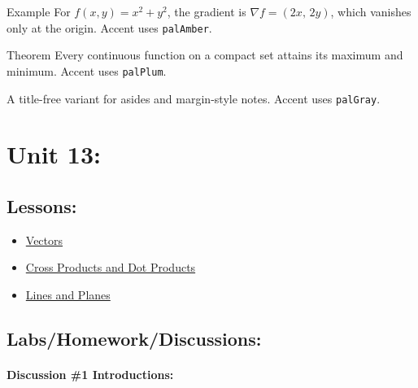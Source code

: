 \documentclass[9pt]{amsart}
\begin{document}
    \vspace{10pt}
    \begin{sleekbox}[palAmber]{Example}
        For $f(x,y)=x^2+y^2$, the gradient is $\nabla f = (2x,\,2y)$, which vanishes only
        at the origin. Accent uses \texttt{palAmber}.
    \end{sleekbox}
     
    \vspace{10pt}
        \begin{sleekbox}[palPlum]{Theorem}
        Every continuous function on a compact set attains its maximum and minimum.
        Accent uses \texttt{palPlum}.
    \end{sleekbox}
     
    \vspace{10pt}
    \begin{sleekplain}[palGray]
    A title-free variant for asides and margin-style notes. Accent uses \texttt{palGray}.
    \end{sleekplain}

\section{Unit 13:}
    \subsection{Lessons:}
        \begin{itemize}
            \item \href{https://www.youtube.com/watch?v=NJiaIr5Y2VU&list=PLVOT1I6lLvjfDhACPSMXam2diM0IBR3hl&index=1&t=1s}{Vectors}
            \item \href{https://www.youtube.com/watch?v=OggR4c3UgKg&list=PLVOT1I6lLvjfDhACPSMXam2diM0IBR3hl&index=2}{Cross Products and Dot Products}
            \item \href{https://www.youtube.com/watch?v=-NPH_D1SqJk&list=PLVOT1I6lLvjfDhACPSMXam2diM0IBR3hl&index=3}{Lines and Planes}
        \end{itemize}
    
    \subsection{Labs/Homework/Discussions:}
        \paragraph{Discussion \#1 Introductions:}\leavevmode\par\medskip
            
            \leavevmode\par\medskip
            
\end{document}
